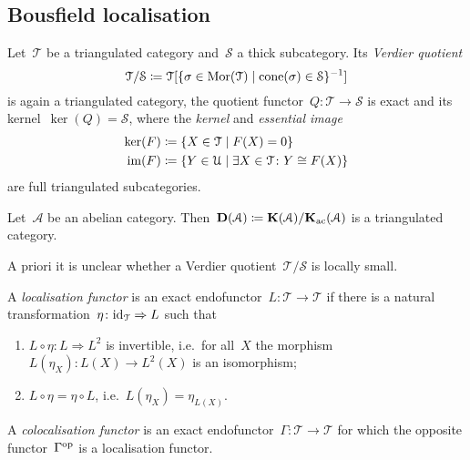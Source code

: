 \documentclass[10pt,a4paper]{article}
\begin{document}
\subsection{Bousfield localisation}
Let~$\mathcal{T}$ be a triangulated category and~$\mathcal{S}$ a thick subcategory. Its \emph{Verdier quotient}
\begin{equation}
  \mathcal{T}/\mathcal{S}\coloneqq\mathcal{T}[\{\sigma\in\operatorname{Mor}(\mathcal{T})\mid\operatorname{cone}(\sigma)\in\mathcal{S}\}^{-1}]
\end{equation}
is again a triangulated category, the quotient functor~$Q\colon\mathcal{T}\to\mathcal{S}$ is exact and its kernel~$\ker(Q)=\mathcal{S}$, where the \emph{kernel} and \emph{essential image}
\begin{equation}
  \begin{aligned}
    \ker(F)&\coloneqq\{X\in\mathcal{T}\mid F(X)=0\} \\
    \operatorname{im}(F)&\coloneqq\{Y\in\mathcal{U}\mid \exists X\in\mathcal{T}\colon Y\cong F(X)\}
  \end{aligned}
\end{equation}
are full triangulated subcategories.
\begin{example}
  Let~$\mathcal{A}$ be an abelian category. Then~$\mathbf{D}(\mathcal{A})\coloneqq\mathbf{K}(\mathcal{A})/\mathbf{K}_{\mathrm{ac}}(\mathcal{A})$ is a triangulated category.
\end{example}
\begin{remark}
  A priori it is unclear whether a Verdier quotient~$\mathcal{T}/\mathcal{S}$ is locally small.
\end{remark}
\begin{definition}
  A \emph{localisation functor} is an exact endofunctor~$L\colon\mathcal{T}\to\mathcal{T}$ if there is a natural transformation~$\eta\colon\mathrm{id}_{\mathcal{T}}\Rightarrow L$ such that
  \begin{enumerate}
    \item $L\circ\eta\colon L\Rightarrow L^2$ is invertible, i.e.\ for all~$X$ the morphism~$L(\eta_X)\colon L(X)\to L^2(X)$ is an isomorphism;
    \item $L\circ\eta=\eta\circ L$, i.e.\ $L(\eta_X)=\eta_{L(X)}$.
  \end{enumerate}
\end{definition}
\begin{definition}
  A \emph{colocalisation functor} is an exact endofunctor~$\Gamma\colon\mathcal{T}\to\mathcal{T}$ for which the opposite functor~$\Gamma^{\mathrm{op}}$ is a localisation functor.
\end{definition}
\end{document}
